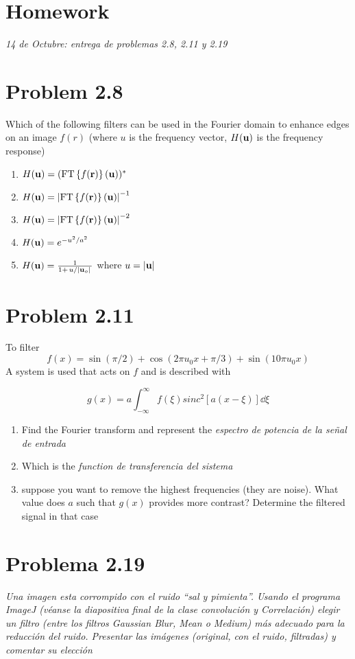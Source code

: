 \documentclass[../main/main.tex]{subfiles}
\begin{document}
\section{Homework}

\emph{14 de Octubre: entrega de problemas 2.8, 2.11 y 2.19}

\section*{Problem 2.8}


Which of the following filters can be used in the Fourier domain to enhance edges on an image $f(r)$ (where $u$ is the frequency vector, $H(\vb{u})$ is the frequency response)

\begin{enumerate}
	\item $H(\vb{u}) = (\textrm{FT}\left\{f(\vb{r})\right\}(\vb{u}))^{*}$
	\item $H(\vb{u}) = \abs{\textrm{FT}\left\{f(\vb{r})\right\}(\vb{u})}^{-1}$
	\item $H(\vb{u}) = \abs{\textrm{FT}\left\{f(\vb{r})\right\}(\vb{u})}^{-2}$
	\item $H(\vb{u}) = e^{-u^{2}/a^{2}}$
	\item $H(\u) = \frac{1}{1+\flatfrac {u}{|\u_{o}|}}$ where $u = \abs{\vb{u}}$
\end{enumerate}

\section*{Problem 2.11}

To filter
\begin{equation*}
f(x) = \sin(\pi/2) + \cos(2\pi u_{0}x + \pi/3) + \sin(10\pi u_{0} x)
\end{equation*}
A system is used that acts on $f$ and is described with

\begin{equation*}
g(x) = a \int_{-\infty}^{\infty} %
f(\xi) sinc^{2}\left[a(x - \xi)\right]\dd{\xi}
\end{equation*}

\begin{enumerate}
	\item Find the Fourier transform and represent the \emph{espectro de potencia de la señal de entrada}
	\item Which is the \emph{function de transferencia del sistema}
	\item suppose you want to remove the highest frequencies (they are noise). What value does $a$ such that $g(x)$ provides more contrast? Determine the filtered signal in that case

\end{enumerate}

\section*{Problema 2.19}

\emph{Una imagen esta corrompido con el ruido ``sal y pimienta''. Usando el programa ImageJ (véanse la diapositiva final de la clase convolución y Correlación) elegir un filtro (entre los filtros Gaussian Blur, Mean o Medium) más adecuado para la reducción del ruido. Presentar las imágenes (original, con el ruido, filtradas) y comentar su elección}
\end{document}
